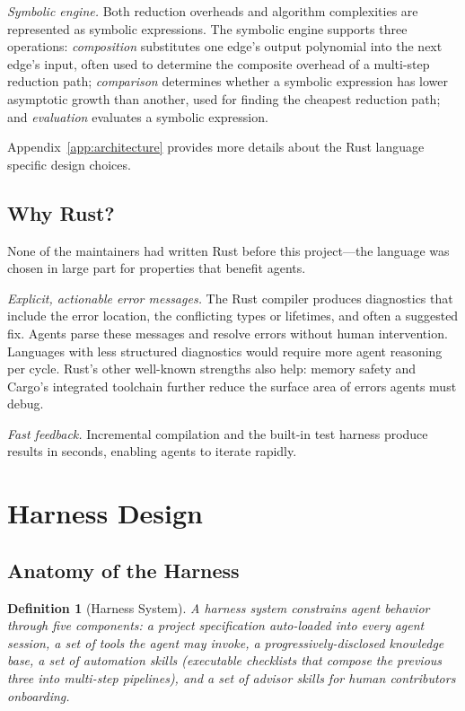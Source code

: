 \documentclass[conference]{IEEEtran}
\newtheorem{definition}{Definition}
\begin{document}
\emph{Symbolic engine.}
Both reduction overheads and algorithm complexities are represented as symbolic expressions.
The symbolic engine supports three operations: \emph{composition} substitutes one edge's output polynomial into the next edge's input, often used to determine the composite overhead of a multi-step reduction path; \emph{comparison} determines whether a symbolic expression has lower asymptotic growth than another, used for finding the cheapest reduction path; and \emph{evaluation} evaluates a symbolic expression.

Appendix~\ref{app:architecture} provides more details about the Rust language specific design choices.

\subsection{Why Rust?}\label{sec:why-rust}

None of the maintainers had written Rust before this project---the language was chosen in large part for properties that benefit agents.

\emph{Explicit, actionable error messages.}
The Rust compiler produces diagnostics that include the error location, the conflicting types or lifetimes, and often a suggested fix.
Agents parse these messages and resolve errors without human intervention.
Languages with less structured diagnostics would require more agent reasoning per cycle.
Rust's other well-known strengths also help: memory safety and Cargo's integrated toolchain further reduce the surface area of errors agents must debug.

\emph{Fast feedback.}
Incremental compilation and the built-in test harness produce results in seconds, enabling agents to iterate rapidly.


\section{Harness Design}\label{sec:method}

\subsection{Anatomy of the Harness}\label{sec:skills}

\begin{definition}[Harness System]
A \emph{harness system} constrains agent behavior through five components: a project specification auto-loaded into every agent session, a set of tools the agent may invoke, a progressively-disclosed knowledge base, a set of automation skills (executable checklists that compose the previous three into multi-step pipelines), and a set of advisor skills for human contributors onboarding.
\end{definition}
\end{document}
